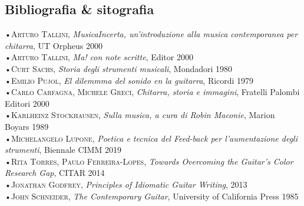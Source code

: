 \documentclass[oneside]{article}
\begin{document}
\begin{multicols*}{2}
\section{ Bibliografia \& sitografia}
•\textsc{\textsf {Arturo Tallini}}, \emph{MusicaIncerta, un'introduzione alla musica contemporanea per chitarra}, UT Orpheus 2000\\
•\textsc{\textsf {Arturo Tallini}}, \emph{Ma! con note scritte}, Editor 2000\\
•\textsc{\textsf {Curt Sachs}}, \emph{Storia degli strumenti musicali}, Mondadori 1980\\
•\textsc{\textsf {Emilio Pujol}}, \emph{El dilemmma del sonido en la guitarra}, Ricordi 1979\\
•\textsc{\textsf {Carlo Carfagna, Michele Greci}}, \emph{Chitarra, storia e immagini}, Fratelli Palombi Editori 2000\\
•\textsc{\textsf {Karlheinz Stockhausen}}, \emph{Sulla musica, a cura di Robin Maconie}, Marion Boyars 1989\\
•\textsc{\textsf {Michelangelo Lupone}}, \emph{Poetica e tecnica del Feed-back per l’aumentazione degli strumenti}, Biennale CIMM 2019\\
•\textsc{\textsf {Rita Torres, Paulo Ferreira-Lopes}}, \emph{Towards Overcoming the Guitar's Color Research Gap}, CITAR 2014\\
•\textsc{\textsf {Jonathan Godfrey}}, \emph{Principles of Idiomatic Guitar Writing},  2013\\
•\textsc{\textsf {John Schneider}}, \emph{The Contemporary Guitar},  University of California Press 1985\\


\end{multicols*}
\end{document}
